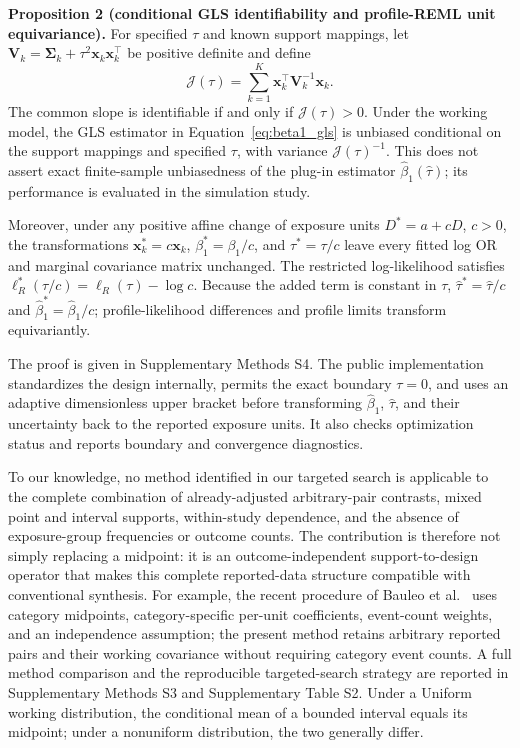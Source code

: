 \documentclass[journal=rsm]{CUP-JNL-DTM}%
\theoremstyle{definition}
\numberwithin{equation}{section}
\begin{document}
\noindent\textbf{Proposition 2 (conditional GLS identifiability and profile-REML unit equivariance).}
For specified $\tau$ and known support mappings, let
$\mathbf V_k=\boldsymbol\Sigma_k+\tau^2\mathbf x_k\mathbf x_k^\top$
be positive definite and define
\begin{equation}
 \mathcal J(\tau)=
 \sum_{k=1}^K \mathbf x_k^\top\mathbf V_k^{-1}\mathbf x_k.
 \label{eq:information}
\end{equation}
The common slope is identifiable if and only if $\mathcal J(\tau)>0$. Under
the working model, the GLS estimator in Equation~\eqref{eq:beta1_gls} is
unbiased conditional on the support mappings and specified $\tau$, with
variance $\mathcal J(\tau)^{-1}$. This does not assert exact finite-sample
unbiasedness of the plug-in estimator $\widehat\beta_1(\widehat\tau)$; its
performance is evaluated in the simulation study.

Moreover, under any positive affine change of exposure units $D^*=a+cD$,
$c>0$, the transformations $\mathbf x_k^*=c\mathbf x_k$,
$\beta_1^*=\beta_1/c$, and $\tau^*=\tau/c$ leave every fitted log OR and
marginal covariance matrix unchanged. The restricted log-likelihood satisfies
$\ell_R^*(\tau/c)=\ell_R(\tau)-\log c$. Because the added term is constant in
$\tau$, $\widehat\tau^*=\widehat\tau/c$ and
$\widehat\beta_1^*=\widehat\beta_1/c$; profile-likelihood differences and
profile limits transform equivariantly.

The proof is given in Supplementary Methods S4. The public implementation
standardizes the design internally, permits the exact boundary $\tau=0$, and
uses an adaptive dimensionless upper bracket before transforming $\hat\beta_1$,
$\hat\tau$, and their uncertainty back to the reported exposure units. It also
checks optimization status and reports boundary and convergence diagnostics.

To our knowledge, no method identified in our targeted search is applicable to
the complete combination of already-adjusted arbitrary-pair contrasts, mixed
point and interval supports, within-study dependence, and the absence of
exposure-group frequencies or outcome counts. The contribution is therefore not simply replacing a midpoint:
it is an outcome-independent support-to-design operator that makes this complete
reported-data structure compatible with conventional synthesis. For example,
the recent procedure of Bauleo et al.~\cite{Bauleo2026} uses category midpoints,
category-specific per-unit coefficients, event-count weights, and an
independence assumption; the present method retains arbitrary reported pairs
and their working covariance without requiring category event counts. A full
method comparison and the reproducible targeted-search strategy are reported in
Supplementary Methods S3 and Supplementary Table S2. Under a Uniform working
distribution, the conditional mean of a bounded interval equals its midpoint;
under a nonuniform distribution, the two generally differ.
\end{document}
